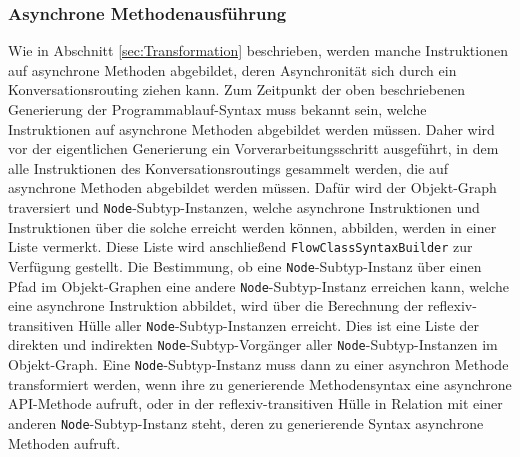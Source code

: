 \subsubsection{Asynchrone Methodenausführung}
\label{subsubsec:Nebenlaeufigkeit}
Wie in Abschnitt \ref{sec:Transformation} beschrieben, werden manche Instruktionen auf asynchrone Methoden abgebildet, deren Asynchronität sich durch ein Konversationsrouting ziehen kann. Zum Zeitpunkt der oben beschriebenen Generierung der Pro\-gramm\-ab\-lauf-Syntax muss bekannt sein, welche Instruktionen auf asynchrone Methoden abgebildet werden müssen. Daher wird vor der eigentlichen Generierung ein Vorverarbeitungsschritt ausgeführt, in dem alle Instruktionen des Konversationsroutings gesammelt werden, die auf asynchrone Methoden abgebildet werden müssen. Dafür wird der Objekt-Graph traversiert und \texttt{Node}-Subtyp-Instanzen, welche asynchrone Instruktionen und Instruktionen über die solche erreicht werden können, abbilden, werden in einer Liste vermerkt. Diese Liste wird anschließend \texttt{FlowClassSyntaxBuilder} zur Verfügung gestellt. Die Bestimmung, ob eine \texttt{Node}-Subtyp-Instanz über einen Pfad im Objekt-Graphen eine andere \texttt{Node}-Subtyp-Instanz erreichen kann, welche eine asynchrone Instruktion abbildet, wird über die Berechnung der reflexiv-transitiven Hülle aller \texttt{Node}-Subtyp-Instanzen erreicht. Dies ist eine Liste der direkten und indirekten \texttt{Node}-Subtyp-Vorgänger aller \texttt{Node}-Subtyp-Instanzen im Objekt-Graph. Eine \texttt{Node}-Subtyp-Instanz muss dann zu einer asynchron Methode transformiert werden, wenn ihre zu generierende Methodensyntax eine asynchrone API-Methode aufruft, oder in der reflexiv-transitiven Hülle in Relation mit einer anderen \texttt{Node}-Subtyp-Instanz steht, deren zu generierende Syntax asynchrone Methoden aufruft.

